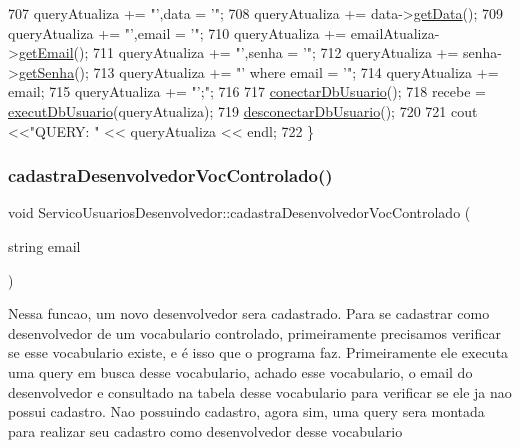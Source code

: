 \begin{DoxyCode}
707   queryAtualiza += \textcolor{stringliteral}{"',data = '"};
708   queryAtualiza += data->\mbox{\hyperlink{class_data_afc7b15a5e81334858e48709b2f45cdc3}{getData}}();
709   queryAtualiza += \textcolor{stringliteral}{"',email = '"};
710   queryAtualiza += emailAtualiza->\mbox{\hyperlink{class_email_aa9a0e1a66b4efde65cf017bdd1c6c625}{getEmail}}();
711   queryAtualiza += \textcolor{stringliteral}{"',senha = '"};
712   queryAtualiza += senha->\mbox{\hyperlink{class_senha_a8786b3d03b1652e73df1cdce46cbbaaf}{getSenha}}();
713   queryAtualiza += \textcolor{stringliteral}{"' where email = '"};
714   queryAtualiza += email;
715   queryAtualiza += \textcolor{stringliteral}{"';"};
716 
717   \mbox{\hyperlink{comando_sql_8cpp_a4f89ddcbc4cf8f2587d89f72f8c7900d}{conectarDbUsuario}}();
718   recebe = \mbox{\hyperlink{comando_sql_8cpp_a748197580e7f9acdbf48c78de1f7924b}{executDbUsuario}}(queryAtualiza);
719   \mbox{\hyperlink{comando_sql_8cpp_a969be9911913568e30d4ae8963338bc3}{desconectarDbUsuario}}();
720 
721   cout <<\textcolor{stringliteral}{"QUERY: "} << queryAtualiza << endl;
722 \}
\end{DoxyCode}
\mbox{\label{class_servico_usuarios_desenvolvedor_a1708877c02739b2447862b2e2349267d}} 
\subsubsection{\texorpdfstring{cadastra\+Desenvolvedor\+Voc\+Controlado()}{cadastraDesenvolvedorVocControlado()}}
{\footnotesize\ttfamily void Servico\+Usuarios\+Desenvolvedor\+::cadastra\+Desenvolvedor\+Voc\+Controlado (\begin{DoxyParamCaption}\item[{string}]{email }\end{DoxyParamCaption})\hspace{0.3cm}{\ttfamily [virtual]}}

Nessa funcao, um novo desenvolvedor sera cadastrado. Para se cadastrar como desenvolvedor de um vocabulario controlado, primeiramente precisamos verificar se esse vocabulario existe, e é isso que o programa faz. Primeiramente ele executa uma query em busca desse vocabulario, achado esse vocabulario, o email do desenvolvedor e consultado na tabela desse vocabulario para verificar se ele ja nao possui cadastro. Nao possuindo cadastro, agora sim, uma query sera montada para realizar seu cadastro como desenvolvedor desse vocabulario

